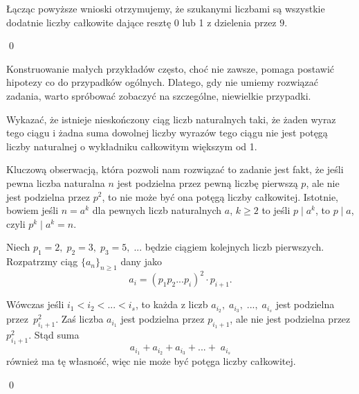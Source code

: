 \noindent
Łącząc powyższe wnioski otrzymujemy, że szukanymi liczbami są wszystkie dodatnie liczby całkowite dające resztę 0 lub 1 z dzielenia przez $9$.

\qed

\vspace{5px}

\noindent
Konstruowanie małych przykładów często, choć nie zawsze, pomaga postawić hipotezy co do przypadków ogólnych. Dlatego, gdy nie umiemy rozwiązać zadania, warto spróbować zobaczyć na szczególne, niewielkie przypadki.

\vspace{10px}


\noindent
Wykazać, że istnieje nieskończony ciąg liczb naturalnych taki, że żaden wyraz tego ciągu i żadna suma dowolnej liczby wyrazów tego ciągu nie jest potęgą liczby naturalnej o wykładniku całkowitym większym
od 1.

\vspace{5px}


\noindent
Kluczową obserwacją, która pozwoli nam rozwiązać to zadanie jest fakt, że jeśli pewna liczba naturalna $n$ jest podzielna przez pewną liczbę pierwszą $p$, ale nie jest podzielna przez $p^2$, to nie może być ona potęgą liczby całkowitej. Istotnie, bowiem jeśli $n = a^k$ dla pewnych liczb naturalnych $a$, $k \geqslant 2$ to jeśli $p \mid a^k$, to $p \mid a$, czyli $p^k \mid a^k = n$.

\vspace{5px}

\noindent
Niech $p_1 = 2,\; p_2 = 3, \; p_3 = 5, \; ...$ będzie ciągiem kolejnych liczb pierwszych.
Rozpatrzmy ciąg $\{a_n\}_{n \geqslant 1}$ dany jako
\[
    a_i = (p_1p_2...p_i)^2\cdot p_{i + 1}. 
\]

\noindent
Wówczas jeśli $i_1 < i_2 < ... < i_s$, to każda z liczb $a_{i_2}, \; a_{i_3}, \;..., \; a_{i_s}$ jest podzielna przez~$p_{i_1 + 1}^2$. Zaś liczba $a_{i_1}$ jest podzielna przez $p_{i_1 + 1}$, ale nie jest podzielna przez $p_{i_1 + 1}^2$. Stąd suma
\[
     a_{i_1} + a_{i_2} +  a_{i_3} +  ... + \; a_{i_s}
\]
również ma tę własność, więc nie może być potęga liczby całkowitej.

\qed

\vspace{10px}